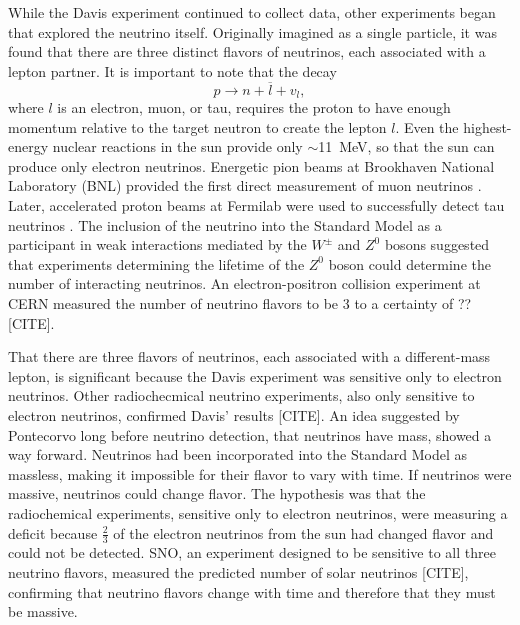 While the Davis experiment continued to collect data, other experiments began that explored the neutrino itself.  Originally imagined as a single particle, it was found that there are three distinct flavors of neutrinos, each associated with a lepton partner.  It is important to note that the decay 
\begin{equation}
p \rightarrow n + \overline{l} + v_l,
\end{equation}
where $l$ is an electron, muon, or tau, requires the proton to have enough momentum relative to the target neutron to create the lepton $l$.  Even the highest-energy nuclear reactions in the sun provide only $\sim$11~MeV, so that the sun can produce only electron neutrinos.  Energetic pion beams at Brookhaven National Laboratory (BNL) provided the first direct measurement of muon neutrinos \cite{muonNeutrino}.  Later, accelerated proton beams at Fermilab were used to successfully detect tau neutrinos \cite{tauNeutrino}.  The inclusion of the neutrino into the Standard Model as a participant in weak interactions mediated by the $W^{\pm}$ and $Z^0$ bosons suggested that experiments determining the lifetime of the $Z^0$ boson could determine the number of interacting neutrinos.  An electron-positron collision experiment at CERN measured the number of neutrino flavors to be 3 to a certainty of ?? [CITE].

That there are three flavors of neutrinos, each associated with a different-mass lepton, is significant because the Davis experiment was sensitive only to electron neutrinos.  Other radiochecmical neutrino experiments, also only sensitive to electron neutrinos, confirmed Davis' results [CITE].  An idea suggested by Pontecorvo long before neutrino detection, that neutrinos have mass, showed a way forward.  Neutrinos had been incorporated into the Standard Model as massless, making it impossible for their flavor to vary with time.  If neutrinos were massive, neutrinos could change flavor.  The hypothesis was that the radiochemical experiments, sensitive only to electron neutrinos, were measuring a deficit because $\frac{2}{3}$ of the electron neutrinos from the sun had changed flavor and could not be detected.  SNO, an experiment designed to be sensitive to all three neutrino flavors, measured the predicted number of solar neutrinos [CITE], confirming that neutrino flavors change with time and therefore that they must be massive.

